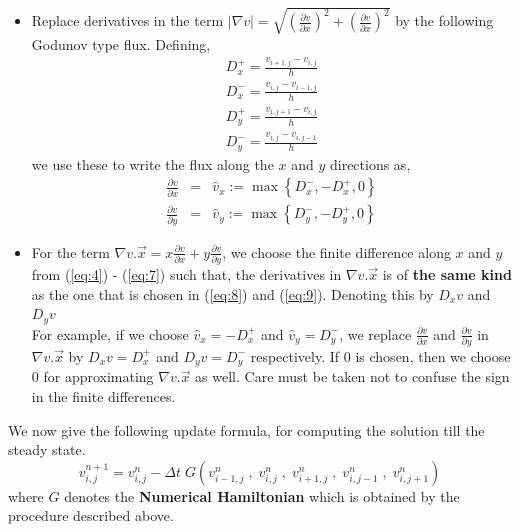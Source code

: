 \documentclass[11pt]{report}
\begin{document}
	\begin{itemize}
		\item
		Replace derivatives in the term $|\nabla v| = \sqrt{\left(\frac{\partial v}{\partial x}\right)^2 + \left(\frac{\partial v}{\partial x}\right)^2 }$ by the following Godunov type flux. Defining, 
		\begin{eqnarray}
			D_x^+ = \frac{v_{i+1,j}-v_{i,j}}{h}\label{eq:4}\\
			D_x^- = \frac{v_{i,j}-v_{i-1,j}}{h}\label{eq:5}\\
			D_y^+ = \frac{v_{i,j+1}-v_{i,j}}{h}\label{eq:6}\\
			D_y^- = \frac{v_{i,j}-v_{i,j-1}}{h}\label{eq:7}
		\end{eqnarray}
		we use these to write the flux along the $x$ and $y$ directions as,
		\begin{eqnarray}
		\frac{\partial v }{\partial x} &=& \hat{v}_x := \max \left\{ D_x^-,-D_x^+,0  \right\}\label{eq:8} \\
		\frac{\partial v }{\partial y} &=& \hat{v}_y := \max \left\{ D_y^-,-D_y^+,0  \right\} \label{eq:9}
		\end{eqnarray}
		
		\item
		For the term $\nabla v. \vec{x} = x\frac{\partial v}{\partial x} + y\frac{\partial v}{\partial y}$, we choose the finite difference along $x$ and $y$ from (\ref{eq:4}) - (\ref{eq:7}) such that, the derivatives in $\nabla v.\vec{x}$ is of \textbf{the same kind} as the one that is chosen in (\ref{eq:8}) and (\ref{eq:9}). Denoting this by $D_xv$ and $D_yv$ \\
		For example, if we choose $\hat{v}_x = -D^+_x$ and $\hat{v}_y = D^-_y$, we replace $\frac{\partial v}{\partial x}$ and $\frac{\partial v}{\partial y}$ in $\nabla v.\vec{x}$ by $D_x v = D^+_x$ and $D_y v = D^-_y$ respectively. If $0$ is chosen, then we choose $0$ for approximating $\nabla v.\vec{x}$ as well. Care must be taken not to confuse the sign in the finite differences.
	\end{itemize}
	\noindent
	We now give the following update formula, for computing the solution till the steady state.
	\begin{equation}
		v_{i,j}^{n+1} = v_{i,j}^{n} - \Delta t  \;G(v_{i-1,j}^n\;,\;v_{i,j}^n\;,\;v_{i+1,j}^n\;,\;v_{i,j-1}^n\;,\;v_{i,j+1}^n)\label{eq:10}
	\end{equation}
	\noindent
	where $G$ denotes the \textbf{Numerical Hamiltonian} which is obtained by the procedure described above. \\
	
\end{document}
